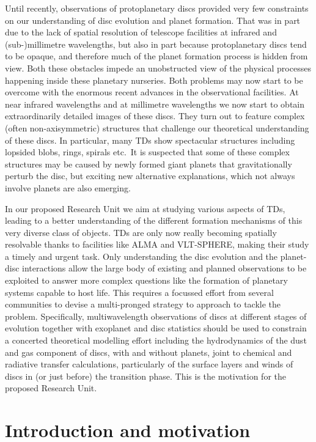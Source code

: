 \documentclass[10pt,fleqn,twoside]{article}
\begin{document}
Until recently, observations of protoplanetary discs provided very few
constraints on our understanding of disc evolution and planet formation. That was in part due
to the lack of spatial resolution of telescope facilities at infrared and
(sub-)millimetre wavelengths, but also in part because protoplanetary discs
tend to be opaque, and therefore much of the planet formation process is
hidden from view. Both these obstacles impede an unobstructed view of the
physical processes happening inside these planetary nurseries. Both problems may now start to
be overcome with the enormous recent advances in the observational
facilities. At near infrared wavelengths and at millimetre wavelengths we
now start to obtain extraordinarily detailed images of these discs. They
turn out to feature complex (often non-axisymmetric) structures that
challenge our theoretical understanding of these discs. In particular,
many TDs show spectacular structures including lopsided blobs, rings,
spirals etc.\ It is suspected 
that some of these complex structures may be caused by newly formed giant
planets that gravitationally perturb the disc, but exciting new
alternative explanations, which not always involve planets are also emerging. 

In our proposed Research Unit we aim at studying various aspects of
TDs, leading to a better understanding of the different formation
mechanisms of this very diverse class of objects. TDs are
only now really becoming spatially resolvable thanks
to facilities like ALMA and VLT-SPHERE, making their study a timely and
urgent task. Only understanding the disc evolution and the planet-disc
interactions allow the large body of existing and planned observations to be
exploited to answer more complex questions like the formation of planetary
systems capable to host life. This requires a focussed effort from
several communities to devise a multi-pronged strategy to approach to
tackle the problem. Specifically, multiwavelength observations of discs at
different stages of evolution together with exoplanet and disc statistics
should be used to constrain a concerted theoretical modelling effort
including the hydrodynamics of the dust and gas component of discs, with and
without planets, joint to chemical and radiative transfer calculations,
particularly of the surface layers and winds of discs in (or just
before) the transition phase. This is the motivation for the proposed Research Unit.


\section{Introduction and motivation}
\end{document}
